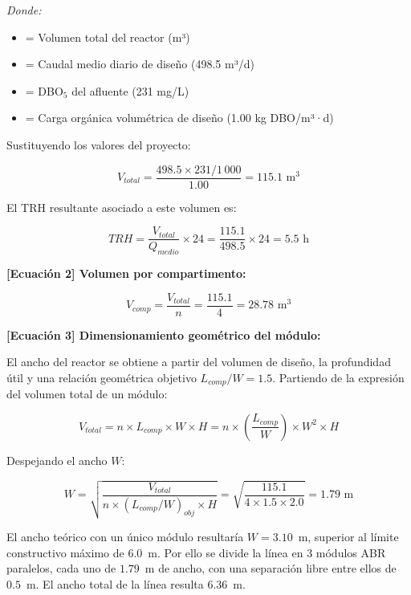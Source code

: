 \documentclass[12pt,a4paper]{article}
\begin{document}
\textit{Donde:}
\begin{itemize}[noitemsep,leftmargin=2em]
    \item[$V_{total}$] = Volumen total del reactor (m³)
    \item[$Q_{medio}$] = Caudal medio diario de diseño (498.5 m³/d)
    \item[$DBO_{entrada}$] = DBO$_5$ del afluente (231 mg/L)
    \item[$COV_{dise\~no}$] = Carga orgánica volumétrica de diseño (1.00 kg DBO/m³·d)
\end{itemize}

Sustituyendo los valores del proyecto:

\begin{equation}
V_{total} = \frac{498.5 \times 231 / 1\,000}{1.00} = 115.1 \text{ m}^3
\end{equation}

El TRH resultante asociado a este volumen es:

\begin{equation}
TRH = \frac{V_{total}}{Q_{medio}} \times 24 = \frac{115.1}{498.5} \times 24 = 5.5 \text{ h}
\end{equation}

\textbf{[Ecuación 2] Volumen por compartimento:}

\begin{equation}
V_{comp} = \frac{V_{total}}{n} = \frac{115.1}{4} = 28.78 \text{ m}^3
\end{equation}

\textbf{[Ecuación 3] Dimensionamiento geométrico del módulo:}

El ancho del reactor se obtiene a partir del volumen de diseño, la profundidad útil y una relación geométrica objetivo $L_{comp}/W = 1.5$. Partiendo de la expresión del volumen total de un módulo:

\begin{equation}
V_{total} = n \times L_{comp} \times W \times H = n \times \left( \frac{L_{comp}}{W} \right) \times W^2 \times H
\end{equation}

Despejando el ancho $W$:

\begin{equation}
W = \sqrt{\frac{V_{total}}{n \times (L_{comp}/W)_{obj} \times H}} = \sqrt{\frac{115.1}{4 \times 1.5 \times 2.0}} = 1.79 \text{ m}
\end{equation}

El ancho teórico con un único módulo resultaría $W = 3.10$~m, superior al límite constructivo máximo de $6.0$~m. Por ello se divide la línea en $3$ módulos ABR paralelos, cada uno de $1.79$~m de ancho, con una separación libre entre ellos de $0.5$~m. El ancho total de la línea resulta $6.36$~m.
\end{document}
